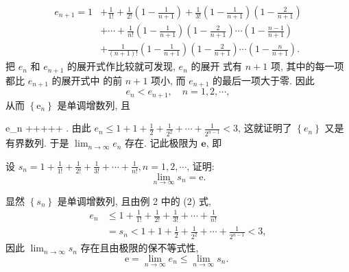 \documentclass[t,12pt,mathserif] {beamer}
\begin{document}
\begin{frame}{}%

$$
\begin{aligned}
e_{n+1}=1 & +\frac{1}{1 !}+\frac{1}{2 !}\left(1-\frac{1}{n+1}\right)+\frac{1}{3 !}\left(1-\frac{1}{n+1}\right)\left(1-\frac{2}{n+1}\right) \\
& +\cdots+\frac{1}{n !}\left(1-\frac{1}{n+1}\right)\left(1-\frac{2}{n+1}\right) \cdots\left(1-\frac{n-1}{n+1}\right) \\
& +\frac{1}{(n+1) !}\left(1-\frac{1}{n+1}\right)\left(1-\frac{2}{n+1}\right) \cdots\left(1-\frac{n}{n+1}\right) .
\end{aligned}
$$
\vsp
把 $e_n$ 和 $e_{n+1}$ 的展开式作比较就可发现, $e_n$ 的展开 式有 $n+1$ 项, 其中的每一项都比 $e_{n+1}$ 的展开式中 的前 $n+1$ 项小, 而 $e_{n+1}$ 的最后一项大于零. 因此  
$$
e_n<e_{n+1}, \quad n=1,2, \cdots,
$$
从而 $\left\{\mathrm{e}_n\right\}$ 是单调增数列, 且

\end{frame}

\begin{frame}{}%
  \bena
e_n ++++\cdots+ .
\eena
由此 $e_n \leq 1+1+\frac{1}{2}+\frac{1}{2^2}+\cdots+\frac{1}{2^{n-1}}<3$, 这就证明了 $\left\{e_n\right\}$ 又是有界数列. 于是 $\lim _{n \rightarrow \infty} e_n$ 存在. 记此极限为 $\mathbf{e}$, 即
\end{frame}

\begin{frame}{}%
\setcounter{starli}{2}
\begin{starli}
 设 $s_n=1+\frac{1}{1 !}+\frac{1}{2 !}+\frac{1}{3 !}+\cdots+\frac{1}{n !}, n=1,2, \cdots$, 证明:
$$
\lim _{n \rightarrow \infty} s_n=\mathrm{e} .
$$ 
\end{starli}
\zheng 显然 $\left\{s_n\right\}$ 是单调增数列, 且由例 2 中的 (2) 式,
$$
\begin{aligned}
e_n & \leq 1+\frac{1}{1 !}+\frac{1}{2 !}+\frac{1}{3 !}+\cdots+\frac{1}{n !} \\
& =s_n<1+1+\frac{1}{2}+\frac{1}{2^2}+\cdots+\frac{1}{2^{n-1}}<3,
\end{aligned}
$$\vsp
因此 $\lim _{n \rightarrow \infty} s_n$ 存在且由极限的保不等式性,
$$
\mathrm{e}=\lim _{n \rightarrow \infty} e_n \leq \lim _{n \rightarrow \infty} s_n \text {. }
$$  
\end{frame}
\end{document}
